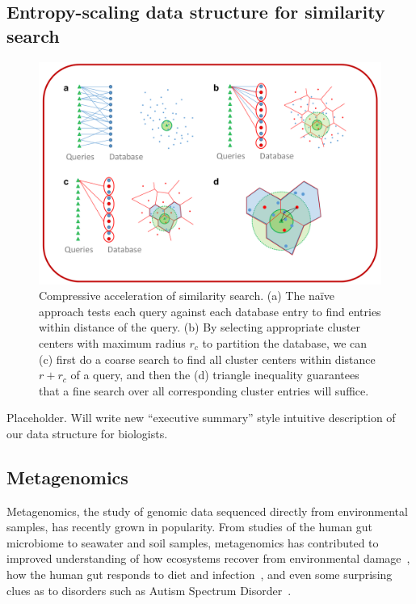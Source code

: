 \documentclass[review,preprint,12pt]{elsarticle}
\renewcommand{\cite}{\citep} %
\theoremstyle{definition}
\theoremstyle{remark}
\numberwithin{equation}{section}
\begin{document}
\subsection{Entropy-scaling data structure for similarity search}
\begin{figure}[btp]
    \centering
    \includegraphics[width=1\textwidth]{assets/dataStructure}
    \caption{ Compressive acceleration of similarity search. %
            (a) The na\"ive approach tests each query against each database entry to find entries within distance  of the query. %
            (b) By selecting appropriate cluster centers with maximum radius $r_c$ to partition the database, we can (c) first do a coarse search to find all cluster centers within distance $r+r_c$ of a query, and then the (d) triangle inequality guarantees that a fine search over all corresponding cluster entries will suffice.}
    \label{fig:dataStructure}
\end{figure}

Placeholder. Will write new ``executive summary'' style intuitive description of our data structure for biologists.


\subsection{Metagenomics}

Metagenomics, the study of genomic data sequenced directly from environmental
samples, has recently grown in popularity.
From studies of the human gut microbiome to seawater and soil samples,
metagenomics has contributed to improved understanding of how ecosystems recover
from environmental damage~\cite{Tyson:2004}, how the human gut responds to 
diet
and infection~\cite{David:2014}, and even some surprising clues as to disorders 
such as Autism Spectrum Disorder~\cite{MacFabe:2012}.
\end{document}
